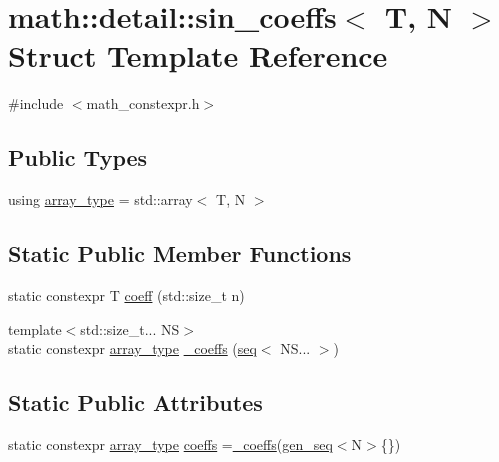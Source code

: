\hypertarget{structmath_1_1detail_1_1sin__coeffs}{}\section{math\+:\+:detail\+:\+:sin\+\_\+coeffs$<$ T, N $>$ Struct Template Reference}
\label{structmath_1_1detail_1_1sin__coeffs}


{\ttfamily \#include $<$math\+\_\+constexpr.\+h$>$}

\subsection*{Public Types}
\begin{DoxyCompactItemize}
\item 
using \hyperlink{structmath_1_1detail_1_1sin__coeffs_a6d08252591f05c40e48bf7931b2eb135}{array\+\_\+type} = std\+::array$<$ T, N $>$
\end{DoxyCompactItemize}
\subsection*{Static Public Member Functions}
\begin{DoxyCompactItemize}
\item 
static constexpr T \hyperlink{structmath_1_1detail_1_1sin__coeffs_ad40f7e723b43aa410e3c260604ae4cac}{coeff} (std\+::size\+\_\+t n)
\item 
{\footnotesize template$<$std\+::size\+\_\+t... NS$>$ }\\static constexpr \hyperlink{structmath_1_1detail_1_1sin__coeffs_a6d08252591f05c40e48bf7931b2eb135}{array\+\_\+type} \hyperlink{structmath_1_1detail_1_1sin__coeffs_a1c5e8b54d12b2320c994c4eaf7b69b61}{\+\_\+coeffs} (\hyperlink{structmath_1_1detail_1_1seq}{seq}$<$ N\+S... $>$)
\end{DoxyCompactItemize}
\subsection*{Static Public Attributes}
\begin{DoxyCompactItemize}
\item 
static constexpr \hyperlink{structmath_1_1detail_1_1sin__coeffs_a6d08252591f05c40e48bf7931b2eb135}{array\+\_\+type} \hyperlink{structmath_1_1detail_1_1sin__coeffs_a78da0b0c2db5a2c060633a296a21dcc8}{coeffs} =\hyperlink{structmath_1_1detail_1_1sin__coeffs_a1c5e8b54d12b2320c994c4eaf7b69b61}{\+\_\+coeffs}(\hyperlink{structmath_1_1detail_1_1gen__seq}{gen\+\_\+seq}$<$N$>$\{\})
\end{DoxyCompactItemize}


